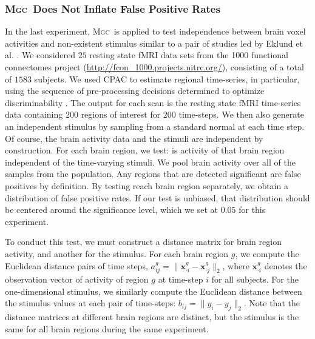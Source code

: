 \documentclass[11pt]{article}
\providecommand{\sct}[1]{{\normalfont\textsc{#1}}}
\providecommand{\mb}[1]{\boldsymbol{#1}}
\newcommand{\Mgc}{\sct{Mgc}}
\begin{document}
\subsubsection*{\Mgc~Does Not Inflate False Positive Rates} %

In the last experiment, \Mgc~is applied to test independence between brain voxel activities and non-existent stimulus similar to a pair of studies led by Eklund et al. \cite{EklundKnutsson2012,Eklund2015}. We considered $25$ resting state fMRI data sets from the 1000 functional connectomes project (\url{http://fcon_1000.projects.nitrc.org/}), consisting of a total of $1583$ subjects.
We used CPAC to estimate regional time-series, in particular, using the sequence of pre-processing decisions determined to optimize discriminability \cite{Wang2016}.  The output for each scan is the resting state fMRI time-series data containing $200$ regions of interest for $200$ time-steps.
We then also generate an independent stimulus  by sampling from a standard normal at each time step.  Of course, the brain activity data and the stimuli are independent by construction.
For each brain region, we test: is activity of that  brain region independent of the time-varying stimuli. We pool brain activity over all of the samples from the population.
Any regions that are detected significant are false positives by definition.  By testing reach brain region separately, we obtain a distribution of false positive rates.  If our test is unbiased, that distribution should be centered around the significance level, which we set at $0.05$ for this experiment.

To conduct this test, we must construct a distance matrix for brain region activity, and another for the stimulus. For each brain region $g$, we compute the Euclidean distance pairs of time steps,  $a_{ij}^g=\|\mb{x}_{\cdot i}^g-\mb{x}_{\cdot j}^g\|_2$,  where $\mb{x}_{\cdot i}^g$ denotes the observation vector of activity of region $g$ at time-step $i$ for all subjects.
For the one-dimensional stimulus, we similarly compute the Euclidean distance between the stimulus values at each pair of time-steps: $b_{ij}= \|y_i - y_j\|_2$.
Note that the distance matrices at different brain regions are distinct, but the stimulus is the same for all brain regions during the same experiment.
\end{document}
